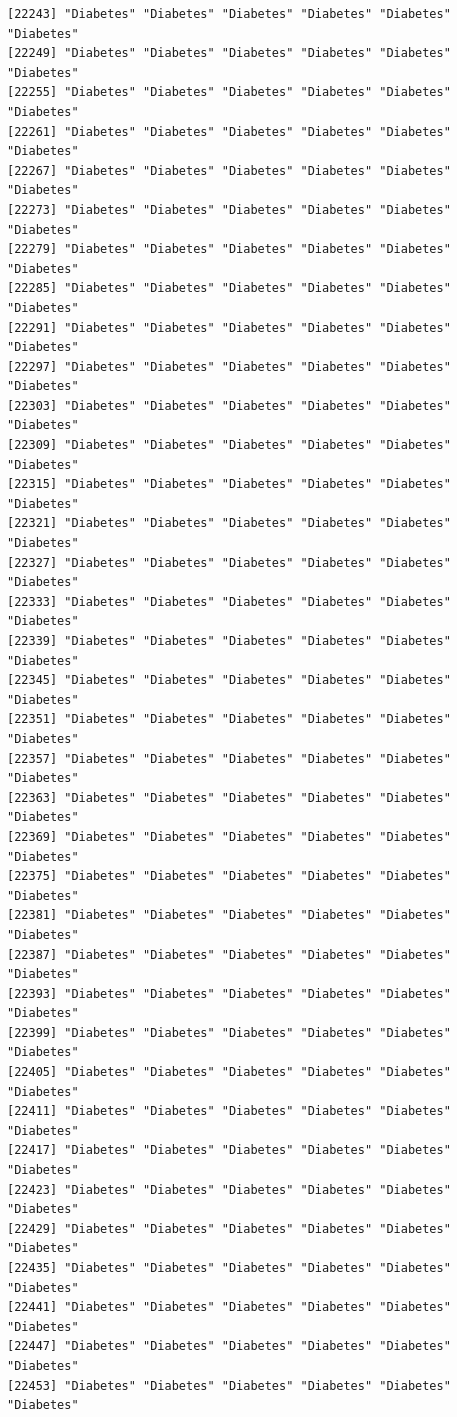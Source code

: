\documentclass[
  letterpaper,
  DIV=11,
  numbers=noendperiod]{scrartcl}
\begin{document}
\begin{verbatim}
[22243] "Diabetes" "Diabetes" "Diabetes" "Diabetes" "Diabetes" "Diabetes"
[22249] "Diabetes" "Diabetes" "Diabetes" "Diabetes" "Diabetes" "Diabetes"
[22255] "Diabetes" "Diabetes" "Diabetes" "Diabetes" "Diabetes" "Diabetes"
[22261] "Diabetes" "Diabetes" "Diabetes" "Diabetes" "Diabetes" "Diabetes"
[22267] "Diabetes" "Diabetes" "Diabetes" "Diabetes" "Diabetes" "Diabetes"
[22273] "Diabetes" "Diabetes" "Diabetes" "Diabetes" "Diabetes" "Diabetes"
[22279] "Diabetes" "Diabetes" "Diabetes" "Diabetes" "Diabetes" "Diabetes"
[22285] "Diabetes" "Diabetes" "Diabetes" "Diabetes" "Diabetes" "Diabetes"
[22291] "Diabetes" "Diabetes" "Diabetes" "Diabetes" "Diabetes" "Diabetes"
[22297] "Diabetes" "Diabetes" "Diabetes" "Diabetes" "Diabetes" "Diabetes"
[22303] "Diabetes" "Diabetes" "Diabetes" "Diabetes" "Diabetes" "Diabetes"
[22309] "Diabetes" "Diabetes" "Diabetes" "Diabetes" "Diabetes" "Diabetes"
[22315] "Diabetes" "Diabetes" "Diabetes" "Diabetes" "Diabetes" "Diabetes"
[22321] "Diabetes" "Diabetes" "Diabetes" "Diabetes" "Diabetes" "Diabetes"
[22327] "Diabetes" "Diabetes" "Diabetes" "Diabetes" "Diabetes" "Diabetes"
[22333] "Diabetes" "Diabetes" "Diabetes" "Diabetes" "Diabetes" "Diabetes"
[22339] "Diabetes" "Diabetes" "Diabetes" "Diabetes" "Diabetes" "Diabetes"
[22345] "Diabetes" "Diabetes" "Diabetes" "Diabetes" "Diabetes" "Diabetes"
[22351] "Diabetes" "Diabetes" "Diabetes" "Diabetes" "Diabetes" "Diabetes"
[22357] "Diabetes" "Diabetes" "Diabetes" "Diabetes" "Diabetes" "Diabetes"
[22363] "Diabetes" "Diabetes" "Diabetes" "Diabetes" "Diabetes" "Diabetes"
[22369] "Diabetes" "Diabetes" "Diabetes" "Diabetes" "Diabetes" "Diabetes"
[22375] "Diabetes" "Diabetes" "Diabetes" "Diabetes" "Diabetes" "Diabetes"
[22381] "Diabetes" "Diabetes" "Diabetes" "Diabetes" "Diabetes" "Diabetes"
[22387] "Diabetes" "Diabetes" "Diabetes" "Diabetes" "Diabetes" "Diabetes"
[22393] "Diabetes" "Diabetes" "Diabetes" "Diabetes" "Diabetes" "Diabetes"
[22399] "Diabetes" "Diabetes" "Diabetes" "Diabetes" "Diabetes" "Diabetes"
[22405] "Diabetes" "Diabetes" "Diabetes" "Diabetes" "Diabetes" "Diabetes"
[22411] "Diabetes" "Diabetes" "Diabetes" "Diabetes" "Diabetes" "Diabetes"
[22417] "Diabetes" "Diabetes" "Diabetes" "Diabetes" "Diabetes" "Diabetes"
[22423] "Diabetes" "Diabetes" "Diabetes" "Diabetes" "Diabetes" "Diabetes"
[22429] "Diabetes" "Diabetes" "Diabetes" "Diabetes" "Diabetes" "Diabetes"
[22435] "Diabetes" "Diabetes" "Diabetes" "Diabetes" "Diabetes" "Diabetes"
[22441] "Diabetes" "Diabetes" "Diabetes" "Diabetes" "Diabetes" "Diabetes"
[22447] "Diabetes" "Diabetes" "Diabetes" "Diabetes" "Diabetes" "Diabetes"
[22453] "Diabetes" "Diabetes" "Diabetes" "Diabetes" "Diabetes" "Diabetes"

\end{verbatim}
\end{document}
